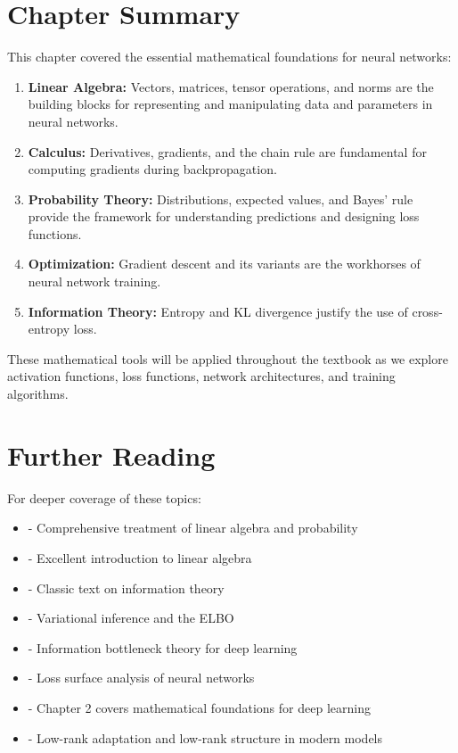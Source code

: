 \section{Chapter Summary}

This chapter covered the essential mathematical foundations for neural networks:

\begin{enumerate}
    \item \textbf{Linear Algebra:} Vectors, matrices, tensor operations, and norms are the building blocks for representing and manipulating data and parameters in neural networks.
    
    \item \textbf{Calculus:} Derivatives, gradients, and the chain rule are fundamental for computing gradients during backpropagation.
    
    \item \textbf{Probability Theory:} Distributions, expected values, and Bayes' rule provide the framework for understanding predictions and designing loss functions.
    
    \item \textbf{Optimization:} Gradient descent and its variants are the workhorses of neural network training.
    
    \item \textbf{Information Theory:} Entropy and KL divergence justify the use of cross-entropy loss.
\end{enumerate}

These mathematical tools will be applied throughout the textbook as we explore activation functions, loss functions, network architectures, and training algorithms.

\section{Further Reading}

For deeper coverage of these topics:

\begin{itemize}
    \item \cite{bishop2006pattern} - Comprehensive treatment of linear algebra and probability
    \item \cite{strang2009introduction} - Excellent introduction to linear algebra
    \item \cite{cover2012elements} - Classic text on information theory
    \item \cite{kingma2013auto} - Variational inference and the ELBO
    \item \cite{tishby2015deep} - Information bottleneck theory for deep learning
    \item \cite{choromanska2015loss} - Loss surface analysis of neural networks
    \item \cite{goodfellow2016deep} - Chapter 2 covers mathematical foundations for deep learning
    \item \cite{hu2021lora} - Low-rank adaptation and low-rank structure in modern models
\end{itemize}

